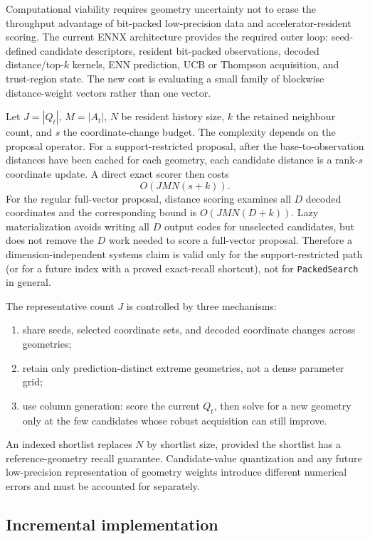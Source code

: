 \documentclass[11pt]{article}
\theoremstyle{definition}
\theoremstyle{remark}
\newcommand{\1}{\mathbf 1}
\begin{document}
Computational viability requires geometry uncertainty not to erase the throughput advantage of
bit-packed low-precision data and accelerator-resident scoring.  The current ENNX architecture
provides the required outer loop: seed-defined candidate descriptors, resident bit-packed
observations, decoded distance/top-$k$ kernels, ENN prediction, UCB or Thompson acquisition, and
trust-region state.  The new cost is evaluating a small family of blockwise distance-weight vectors
rather than one vector.

Let $J=|Q_t|$, $M=|A_t|$, $N$ be resident history size, $k$ the retained neighbour count, and $s$
the coordinate-change budget.  The complexity depends on the proposal operator.  For a
support-restricted proposal, after the base-to-observation distances have been cached for each
geometry, each candidate distance is a rank-$s$ coordinate update.  A direct exact scorer then costs
\begin{equation}\label{eq:support-cost}
  O(JMN(s+k)).
\end{equation}
For the regular full-vector proposal, distance scoring examines all $D$ decoded coordinates and the
corresponding bound is $O(JMN(D+k))$.  Lazy materialization avoids writing all $D$ output codes for
unselected candidates, but does not remove the $D$ work needed to score a full-vector proposal.
Therefore a dimension-independent systems claim is valid only for the support-restricted path (or
for a future index with a proved exact-recall shortcut), not for \texttt{PackedSearch} in general.

The representative count $J$ is controlled by three mechanisms:
\begin{enumerate}
\item share seeds, selected coordinate sets, and decoded coordinate changes across geometries;
\item retain only prediction-distinct extreme geometries, not a dense parameter grid;
\item use column generation: score the current $Q_t$, then solve for a new geometry only at the few
candidates whose robust acquisition can still improve.
\end{enumerate}
An indexed shortlist replaces $N$ by shortlist size, provided the shortlist has a reference-geometry
recall guarantee.  Candidate-value quantization and any future low-precision representation of
geometry weights introduce different numerical errors and must be accounted for separately.

\subsection{Incremental implementation}
\end{document}

